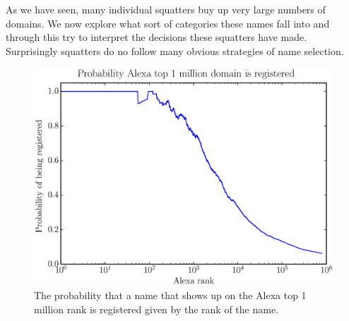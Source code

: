 As we have seen, many individual squatters buy up very large numbers of domains. We now explore what sort of categories these names fall into and through this try to interpret the decisions these squatters have made. Surprisingly squatters do no follow many obvious strategies of name selection.

\begin{figure}
  \centering
  \includegraphics[width=\columnwidth]{figures/alexa_probability}
  \caption{The probability that a name that shows up on the Alexa top 1 million rank is registered given by the rank of the name.}
  \label{fig:alexa_probability}
\end{figure}